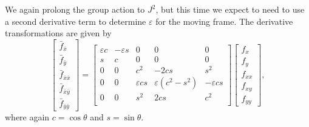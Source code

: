 \documentclass[review,onefignum,onetabnum]{siamonline190516}
\begin{document}
{We again prolong the group action to $J^2$, but this time we expect to need
to use a second derivative term to determine $\varepsilon$ for the moving
frame. The derivative transformations are given by
\begin{equation}
  \begin{bmatrix}
  \bar f_{\bar x} \\ \bar f_{\bar y} \\ \bar f_{\bar{x}\bar{x}} \\ \bar f_{\bar{x}\bar{y}} \\ \bar f_{\bar{y}\bar{y}}
  \end{bmatrix} = 
  \begin{bmatrix}
 \varepsilon c & -\varepsilon s & 0 & 0 & 0 \\
 s & c & 0 & 0 & 0 \\
0 & 0 & c^2 & -2cs & s^2 \\
0 & 0 & \varepsilon cs & \varepsilon(c^2 - s^2) & -\varepsilon cs \\
0 & 0 & s^2 & 2cs & c^2 \\
  \end{bmatrix}
  \begin{bmatrix}
f_x \\ f_y \\ f_{xx} \\ f_{xy} \\ f_{yy} 
  \end{bmatrix},
\label{eqn:E2prolongation}
\end{equation}
where again $c = \cos\theta$ and $s = \sin\theta$.  

}
\end{document}
